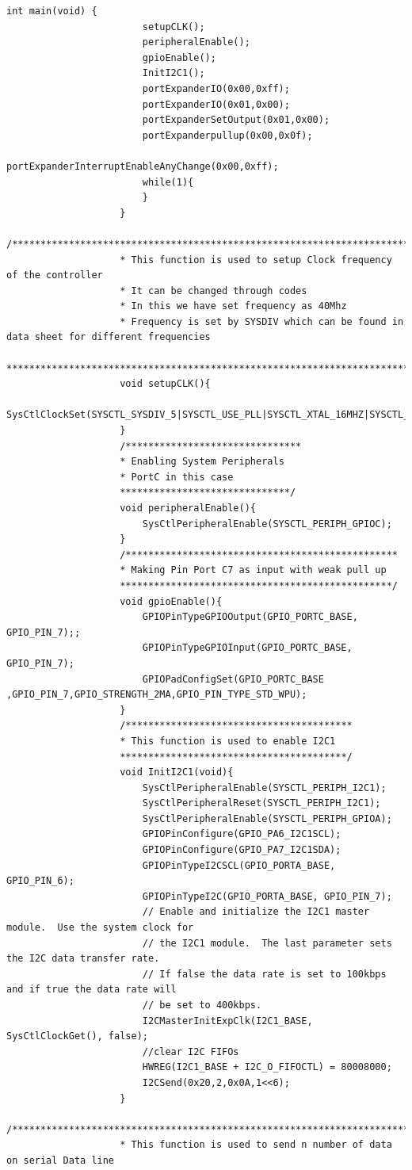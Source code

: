 \documentclass[a4paper,10pt,oneside]{article}
\begin{document}
\begin{lstlisting}[style=CStyle]
					int main(void) {
						setupCLK();
						peripheralEnable();
						gpioEnable();
						InitI2C1();
						portExpanderIO(0x00,0xff);
						portExpanderIO(0x01,0x00);
						portExpanderSetOutput(0x01,0x00);
						portExpanderpullup(0x00,0x0f);
						portExpanderInterruptEnableAnyChange(0x00,0xff);
						while(1){
						}
					}
					/***************************************************************************************
					* This function is used to setup Clock frequency of the controller
					* It can be changed through codes
					* In this we have set frequency as 40Mhz
					* Frequency is set by SYSDIV which can be found in data sheet for different frequencies
					***************************************************************************************/
					void setupCLK(){
						SysCtlClockSet(SYSCTL_SYSDIV_5|SYSCTL_USE_PLL|SYSCTL_XTAL_16MHZ|SYSCTL_OSC_MAIN);
					}
					/*******************************
					* Enabling System Peripherals
					* PortC in this case
					******************************/
					void peripheralEnable(){
						SysCtlPeripheralEnable(SYSCTL_PERIPH_GPIOC);
					}
					/************************************************
					* Making Pin Port C7 as input with weak pull up
					************************************************/
					void gpioEnable(){
						GPIOPinTypeGPIOOutput(GPIO_PORTC_BASE, GPIO_PIN_7);;
						GPIOPinTypeGPIOInput(GPIO_PORTC_BASE, GPIO_PIN_7);
						GPIOPadConfigSet(GPIO_PORTC_BASE ,GPIO_PIN_7,GPIO_STRENGTH_2MA,GPIO_PIN_TYPE_STD_WPU);
					}
					/****************************************
					* This function is used to enable I2C1
					****************************************/
					void InitI2C1(void){
						SysCtlPeripheralEnable(SYSCTL_PERIPH_I2C1);
						SysCtlPeripheralReset(SYSCTL_PERIPH_I2C1);
						SysCtlPeripheralEnable(SYSCTL_PERIPH_GPIOA);
						GPIOPinConfigure(GPIO_PA6_I2C1SCL);
						GPIOPinConfigure(GPIO_PA7_I2C1SDA);
						GPIOPinTypeI2CSCL(GPIO_PORTA_BASE, GPIO_PIN_6);
						GPIOPinTypeI2C(GPIO_PORTA_BASE, GPIO_PIN_7);
						// Enable and initialize the I2C1 master module.  Use the system clock for
						// the I2C1 module.  The last parameter sets the I2C data transfer rate.
						// If false the data rate is set to 100kbps and if true the data rate will
						// be set to 400kbps.
						I2CMasterInitExpClk(I2C1_BASE, SysCtlClockGet(), false);
						//clear I2C FIFOs
						HWREG(I2C1_BASE + I2C_O_FIFOCTL) = 80008000;
						I2CSend(0x20,2,0x0A,1<<6);
					}
					/***********************************************************************
					* This function is used to send n number of data on serial Data line

\end{lstlisting}
\end{document}
